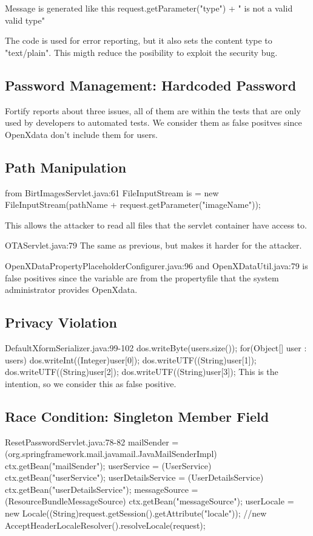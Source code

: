 \documentclass[11pt,a4paper]{article}
\theoremstyle{definition}
\begin{document}
Message is generated like this
request.getParameter("type") + " is not a valid valid type"

The code is used for error reporting, but it also sets the content type to "text/plain".
This migth reduce the posibility to exploit the security bug.

\subsection{Password Management: Hardcoded Password}
Fortify reports about three issues, all of them are within the tests that are only used
by developers to automated tests. We consider them as false positves since OpenXdata don't
include them for users.

\subsection{Path Manipulation}
from BirtImagesServlet.java:61
FileInputStream is = new FileInputStream(pathName + request.getParameter("imageName"));

This allows the attacker to read all files that the servlet container have access to.

OTAServlet.java:79
The same as previous, but makes it harder for the attacker.

OpenXDataPropertyPlaceholderConfigurer.java:96 and OpenXDataUtil.java:79 
is false positives since the variable are from the propertyfile that the system administrator provides OpenXdata.

\subsection{Privacy Violation}
DefaultXformSerializer.java:99-102
dos.writeByte(users.size());
for(Object[] user : users){
    dos.writeInt((Integer)user[0]);
    dos.writeUTF((String)user[1]);
    dos.writeUTF((String)user[2]);
    dos.writeUTF((String)user[3]);
}
This is the intention, so we consider this as false positive.

\subsection{Race Condition: Singleton Member Field}
ResetPasswordServlet.java:78-82
mailSender = (org.springframework.mail.javamail.JavaMailSenderImpl) ctx.getBean("mailSender");
userService = (UserService) ctx.getBean("userService");
userDetailsService = (UserDetailsService) ctx.getBean("userDetailsService");
messageSource = (ResourceBundleMessageSource) ctx.getBean("messageSource");
userLocale = new Locale((String)request.getSession().getAttribute("locale")); //new AcceptHeaderLocaleResolver().resolveLocale(request);
\end{document}
